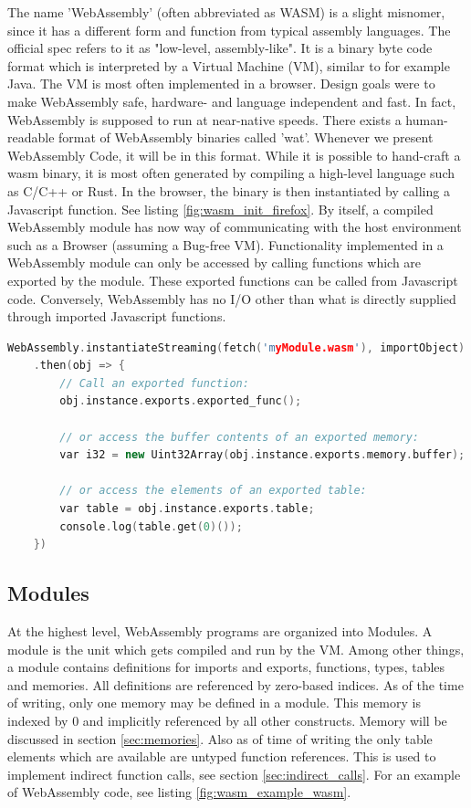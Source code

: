 \documentclass[sigconf]{acmart}
\begin{document}
The name 'WebAssembly' (often abbreviated as WASM) is a slight misnomer, since it has a different form and function from typical assembly languages. The official spec refers to it as "low-level, assembly-like". It is a binary byte code format which is interpreted by a Virtual Machine (VM), similar to for example Java. The VM is most often implemented in a browser. Design goals were to make WebAssembly safe, hardware- and language independent and fast. In fact, WebAssembly is supposed to run at near-native speeds. There exists a human-readable format of WebAssembly binaries called 'wat'. Whenever we present WebAssembly Code, it will be in this format. While it is possible to hand-craft a wasm binary, it is most often generated by compiling a high-level language such as C/C++ or Rust. In the browser, the binary is then instantiated by calling a Javascript function. See listing \ref{fig:wasm_init_firefox}. By itself, a compiled WebAssembly module has now way of communicating with the host environment such as a Browser (assuming a Bug-free VM). Functionality implemented in a WebAssembly module can only be accessed by calling functions which are exported by the module. These exported functions can be called from Javascript code. Conversely, WebAssembly has no I/O other than what is directly supplied through imported Javascript functions. 

\begin{lstlisting}[language=C++, caption={How to instantiate a WebAssembly module using Javascript. (\url{https://developer.mozilla.org/en-US/docs/WebAssembly/Loading_and_running}).}, label=fig:wasm_example_c]
	WebAssembly.instantiateStreaming(fetch('myModule.wasm'), importObject)
	.then(obj => {
		// Call an exported function:
		obj.instance.exports.exported_func();

		// or access the buffer contents of an exported memory:
		var i32 = new Uint32Array(obj.instance.exports.memory.buffer);

		// or access the elements of an exported table:
 		var table = obj.instance.exports.table;
		console.log(table.get(0)());
	})
\end{lstlisting}

\subsection{Modules}
At the highest level, WebAssembly programs are organized into Modules.  A module is the unit which gets compiled and run by the VM. Among other things, a module contains definitions for imports and exports, functions, types, tables and memories. All definitions are referenced by zero-based indices. As of the time of writing, only one memory may be defined in a module. This memory is indexed by 0 and implicitly referenced by all other constructs. Memory will be discussed in section \ref{sec:memories}. Also as of time of writing the only table elements which are available are untyped function references. This is used to implement indirect function calls, see section \ref{sec:indirect_calls}. For an example of WebAssembly code, see listing \ref{fig:wasm_example_wasm}.
\end{document}
